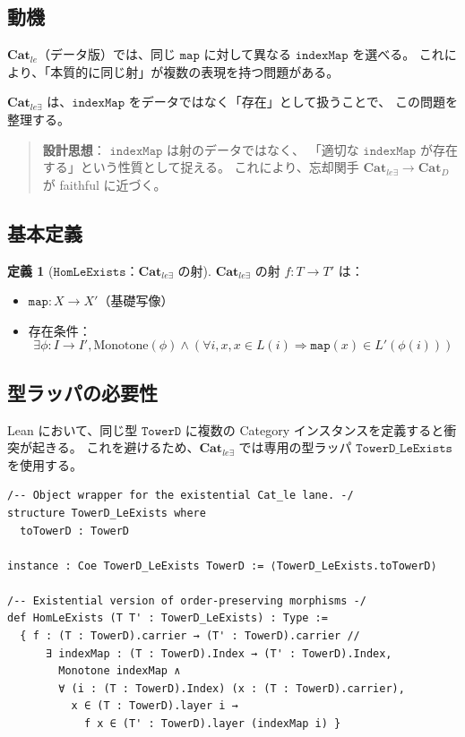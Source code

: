 \documentclass{ltjsarticle}
\theoremstyle{definition}
\newtheorem{definition}{定義}[section]
\newcommand{\catD}{\mathbf{Cat}_D}
\newcommand{\catle}{\mathbf{Cat}_{le}}
\newcommand{\catleexists}{\mathbf{Cat}_{le\exists}}
\newcommand{\TowerD}{\mathtt{TowerD}}
\newcommand{\HomLeExists}{\mathtt{HomLeExists}}
\newcommand{\indexMap}{\mathtt{indexMap}}
\begin{document}
\subsection{動機}

$\catle$（データ版）では、同じ $\mathtt{map}$ に対して異なる $\indexMap$ を選べる。
これにより、「本質的に同じ射」が複数の表現を持つ問題がある。

$\catleexists$ は、$\indexMap$ をデータではなく「存在」として扱うことで、
この問題を整理する。

\begin{quote}
\textbf{設計思想}：
$\indexMap$ は射のデータではなく、
「適切な $\indexMap$ が存在する」という性質として捉える。
これにより、忘却関手 $\catleexists \to \catD$ が faithful に近づく。
\end{quote}

\subsection{基本定義}

\begin{definition}[$\HomLeExists$：$\catleexists$ の射]
\label{def:hom-le-exists}
$\catleexists$ の射 $f : T \to T'$ は：
\begin{itemize}
  \item $\mathtt{map} : X \to X'$（基礎写像）
  \item 存在条件：
    \[
      \exists \phi : I \to I', \text{Monotone}(\phi) \land 
      (\forall i, x, x \in L(i) \Rightarrow \mathtt{map}(x) \in L'(\phi(i)))
    \]
\end{itemize}
\end{definition}

\subsection{型ラッパの必要性}

Lean において、同じ型 $\TowerD$ に複数の Category インスタンスを定義すると衝突が起きる。
これを避けるため、$\catleexists$ では専用の型ラッパ $\mathtt{TowerD\_LeExists}$ を使用する。

\begin{lstlisting}[caption=型ラッパの定義（Cat\_le\_exists.lean より）]
/-- Object wrapper for the existential Cat_le lane. -/
structure TowerD_LeExists where
  toTowerD : TowerD

instance : Coe TowerD_LeExists TowerD := ⟨TowerD_LeExists.toTowerD⟩

/-- Existential version of order-preserving morphisms -/
def HomLeExists (T T' : TowerD_LeExists) : Type :=
  { f : (T : TowerD).carrier → (T' : TowerD).carrier //
      ∃ indexMap : (T : TowerD).Index → (T' : TowerD).Index,
        Monotone indexMap ∧
        ∀ (i : (T : TowerD).Index) (x : (T : TowerD).carrier),
          x ∈ (T : TowerD).layer i →
            f x ∈ (T' : TowerD).layer (indexMap i) }
\end{lstlisting}
\end{document}
